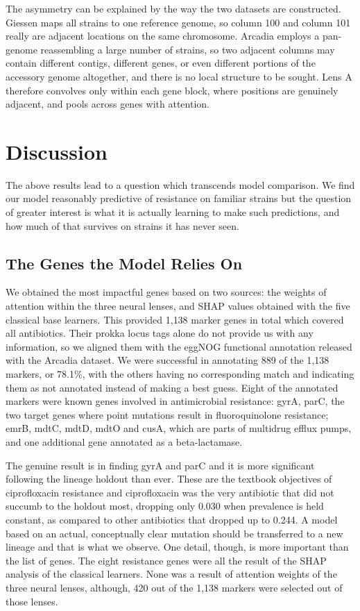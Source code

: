 The asymmetry can be explained by the way the two datasets are constructed. Giessen maps all strains
to one reference genome, so column 100 and column 101 really are adjacent locations on the same
chromosome. Arcadia employs a pan-genome reassembling a large number of strains, so two adjacent
columns may contain different contigs, different genes, or even different portions of the accessory
genome altogether, and there is no local structure to be sought. Lens A therefore convolves only
within each gene block, where positions are genuinely adjacent, and pools across genes with attention.

\FloatBarrier
\section{Discussion}
\label{sec:discussion}

The above results lead to a question which transcends model comparison. We find our model
reasonably predictive of resistance on familiar strains but the question of greater interest is
what it is actually learning to make such predictions, and how much of that survives on strains it
has never seen.

\FloatBarrier
\subsection{The Genes the Model Relies On}
\label{subsec:attnfix}

We obtained the most impactful genes based on two sources: the weights of attention within the
three neural lenses, and SHAP values obtained with the five classical base learners. This provided
1{,}138 marker genes in total which covered all antibiotics. Their prokka locus tags alone do not
provide us with any information, so we aligned them with the eggNOG functional annotation released
with the Arcadia dataset. We were successful in annotating 889 of the 1{,}138 markers, or 78.1\%,
with the others having no corresponding match and indicating them as not annotated instead of
making a best guess. Eight of the annotated markers were known genes involved in antimicrobial
resistance: gyrA, parC, the two target genes where point mutations result in fluoroquinolone
resistance; emrB, mdtC, mdtD, mdtO and cusA, which are parts of multidrug efflux pumps, and one
additional gene annotated as a beta-lactamase.

The genuine result is in finding gyrA and parC and it is more significant following the lineage
holdout than ever. These are the textbook objectives of ciprofloxacin resistance and ciprofloxacin
was the very antibiotic that did not succumb to the holdout most, dropping only 0.030 when
prevalence is held constant, as compared to other antibiotics that dropped up to 0.244. A model
based on an actual, conceptually clear mutation should be transferred to a new lineage and that is
what we observe. One detail, though, is more important than the list of genes. The eight resistance genes were all the
result of the SHAP analysis of the classical learners. None was a result of attention weights of
the three neural lenses, although, 420 out of the 1{,}138 markers were selected out of those
lenses.

